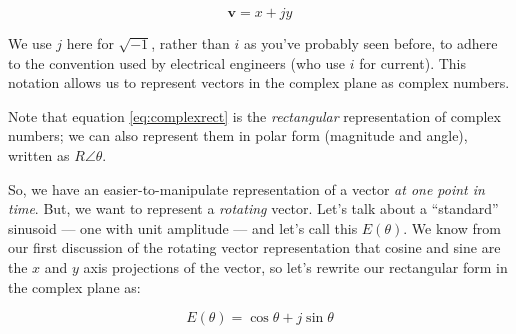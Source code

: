 \begin{equation}
\mathbf{v} = x + j y \label{eq:complexrect}
\end{equation}

We use $j$ here for $\sqrt{-1}$, rather than $i$ as you've probably
seen before, to adhere to the convention used by electrical engineers
(who use $i$ for current). This notation allows us to represent vectors in the complex plane as complex numbers.

Note that equation \ref{eq:complexrect} is the \emph{rectangular} representation of complex
numbers; we can also represent them in polar form (magnitude and
angle), written as $R\angle\theta$. 



So, we have an easier-to-manipulate representation of a vector
\emph{at one point in time}. But, we want to represent a \emph{rotating}
vector.  Let's talk about a ``standard'' sinusoid --- one with unit
amplitude --- and let's call this $E(\theta)$.  We know from our first
discussion of the rotating vector representation that cosine and
sine are the $x$ and $y$ axis projections of the vector, so let's
rewrite our rectangular form in the complex plane as:

\begin{equation}
E(\theta) = \cos\theta + j\sin\theta \label{eq:cmplx-sin-rect}
\end{equation}

